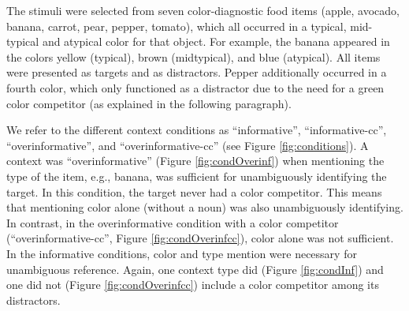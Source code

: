 \documentclass[11pt]{article}
\newcommand{\figref}[1]{Figure \ref{#1}}
\begin{document}
The stimuli were selected from seven color-diagnostic food items (apple, avocado, banana, carrot, pear, pepper, tomato), which all occurred in a typical, mid-typical and atypical color for that object. For example, the banana appeared in the colors yellow (typical), brown (midtypical), and blue (atypical). 
All items were presented as targets and as distractors. Pepper additionally occurred in a fourth color, which only functioned as a distractor due to the need for a green color competitor (as explained in the following paragraph). 

We refer to the different context conditions  as ``informative'', ``informative-cc'', ``overinformative'', and ``overinformative-cc'' (see \figref{fig:conditions}). A context was ``overinformative'' (\figref{fig:condOverinf}) when mentioning the type of the item, e.g., banana, was sufficient for unambiguously identifying the target.  In this condition, the target never had a color competitor. This means that mentioning color alone (without a noun) was also unambiguously identifying. In contrast, in the overinformative condition with a color competitor (``overinformative-cc'', \figref{fig:condOverinfcc}), color alone was not sufficient. In the informative conditions, color and type mention were necessary for unambiguous reference. Again, one context type did (\figref{fig:condInf}) and one did not (\figref{fig:condOverinfcc}) include a color competitor among its distractors.
\end{document}
